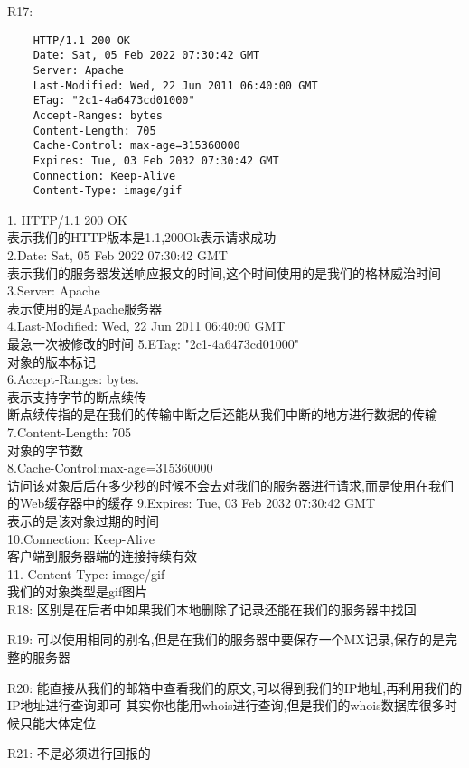 \documentclass[UTF8]{ctexart}
\begin{document}
R17:
\begin{lstlisting}
    HTTP/1.1 200 OK
    Date: Sat, 05 Feb 2022 07:30:42 GMT
    Server: Apache
    Last-Modified: Wed, 22 Jun 2011 06:40:00 GMT
    ETag: "2c1-4a6473cd01000"
    Accept-Ranges: bytes
    Content-Length: 705
    Cache-Control: max-age=315360000
    Expires: Tue, 03 Feb 2032 07:30:42 GMT
    Connection: Keep-Alive
    Content-Type: image/gif
\end{lstlisting}
1. HTTP/1.1 200 OK\\
表示我们的HTTP版本是1.1,200Ok表示请求成功\\
2.Date: Sat, 05 Feb 2022 07:30:42 GMT\\
表示我们的服务器发送响应报文的时间,这个时间使用的是我们的格林威治时间\\
3.Server: Apache\\
表示使用的是Apache服务器\\
4.Last-Modified: Wed, 22 Jun 2011 06:40:00 GMT\\
最急一次被修改的时间
5.ETag: "2c1-4a6473cd01000"\\
对象的版本标记\\
6.Accept-Ranges: bytes.\\
表示支持字节的断点续传\\
断点续传指的是在我们的传输中断之后还能从我们中断的地方进行数据的传输\\
7.Content-Length: 705\\
对象的字节数\\
8.Cache-Control:max-age=315360000\\
访问该对象后后在多少秒的时候不会去对我们的服务器进行请求,而是使用在我们的Web缓存器中的缓存
9.Expires: Tue, 03 Feb 2032 07:30:42 GMT\\
表示的是该对象过期的时间\\
10.Connection: Keep-Alive\\
客户端到服务器端的连接持续有效\\
11. Content-Type: image/gif\\
我们的对象类型是gif图片\\

R18: 区别是在后者中如果我们本地删除了记录还能在我们的服务器中找回

R19: 可以使用相同的别名,但是在我们的服务器中要保存一个MX记录,保存的是完整的服务器

R20: 
能直接从我们的邮箱中查看我们的原文,可以得到我们的IP地址,再利用我们的IP地址进行查询即可
其实你也能用whois进行查询,但是我们的whois数据库很多时候只能大体定位

R21:
不是必须进行回报的
\end{document}
